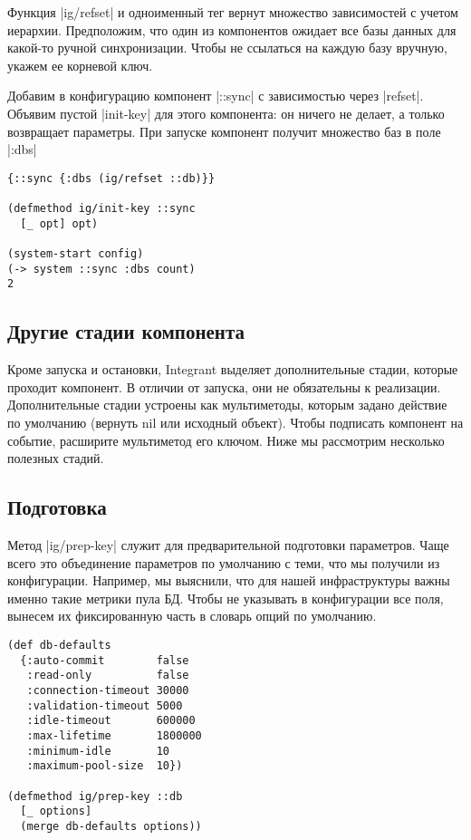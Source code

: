Функция \spverb|ig/refset| и одноименный тег вернут множество зависимостей с учетом
иерархии. Предположим, что один из компонентов ожидает все базы данных для
какой-то ручной синхронизации. Чтобы не ссылаться на каждую базу вручную, укажем
ее корневой ключ.

Добавим в конфигурацию компонент \spverb|::sync| с зависимостью через \spverb|refset|. Объявим
пустой \spverb|init-key| для этого компонента: он ничего не делает, а только возвращает
параметры. При запуске компонент получит множество баз в поле \spverb|:dbs|

\begin{verbatim}
{::sync {:dbs (ig/refset ::db)}}

(defmethod ig/init-key ::sync
  [_ opt] opt)

(system-start config)
(-> system ::sync :dbs count)
2
\end{verbatim}

\subsection{Другие стадии компонента}

Кроме запуска и остановки, Integrant выделяет дополнительные стадии, которые
проходит компонент. В отличии от запуска, они не обязательны к
реализации. Дополнительные стадии устроены как мультиметоды, которым задано
действие по умолчанию (вернуть nil или исходный объект). Чтобы подписать
компонент на событие, расширите мультиметод его ключом. Ниже мы рассмотрим
несколько полезных стадий.

\subsection{Подготовка}

Метод \spverb|ig/prep-key| служит для предварительной подготовки параметров. Чаще всего
это объединение параметров по умолчанию с теми, что мы получили из
конфигурации. Например, мы выяснили, что для нашей инфраструктуры важны именно
такие метрики пула БД. Чтобы не указывать в конфигурации все поля, вынесем их
фиксированную часть в словарь опций по умолчанию.

\begin{verbatim}
(def db-defaults
  {:auto-commit        false
   :read-only          false
   :connection-timeout 30000
   :validation-timeout 5000
   :idle-timeout       600000
   :max-lifetime       1800000
   :minimum-idle       10
   :maximum-pool-size  10})

(defmethod ig/prep-key ::db
  [_ options]
  (merge db-defaults options))
\end{verbatim}

